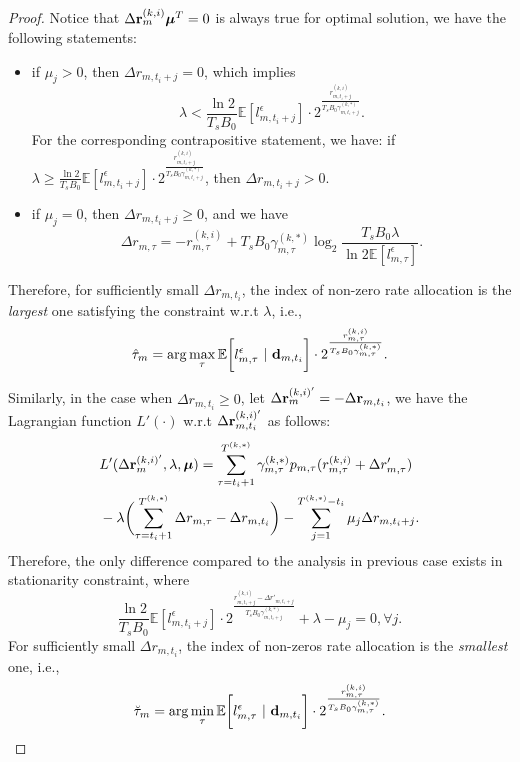 \begin{proof}
    Notice that $\Delta{{\mathbf{r}}}^{(k,i)}_{m} \boldsymbol{\mu}^T = 0$ is always true for optimal solution, we have the following statements:
    \begin{itemize}
        \item if $\mu_j > 0$, then $\Delta{r}_{m,t_i+j} = 0$, which implies
        $$
        \lambda < \frac{\ln{2}}{T_s B_0} \mathbb{E}[l^{\epsilon}_{m,t_i+j}] \cdot 2^{\frac{r^{(k,i)}_{m,t_i+j}}{T_s B_0 \gamma^{(k,*)}_{m,t_i+j}}}.
        $$
        For the corresponding contrapositive statement, we have: if $\lambda \geq \frac{\ln{2}}{T_s B_0} \mathbb{E}[l^{\epsilon}_{m,t_i+j}] \cdot 2^{\frac{r^{(k,i)}_{m,t_i+j}}{T_s B_0 \gamma^{(k,*)}_{m,t_i+j}}}$, then $\Delta{r}_{m,t_i+j} > 0$.
        \item if $\mu_j = 0$, then $\Delta{r}_{m,t_i+j} \geq 0$, and we have
        $$
        \Delta{r}_{m,\tau} = - r^{(k,i)}_{m,\tau} + T_s B_0 \gamma^{(k,*)}_{m,\tau} \log_2{\frac{T_s B_0 \lambda}{\ln{2} \mathbb{E}[l^{\epsilon}_{m,\tau}]}}.
        $$
    \end{itemize}

    Therefore, for sufficiently small $\Delta{r}_{m,t_i}$, the index of non-zero rate allocation is the {\it largest} one satisfying the constraint w.r.t $\lambda$, i.e.,
    $$
    \hat{\tau}_{m} = \arg\max_{\tau} \mathbb{E}\bigg[ l_{m,\tau}^{\epsilon}~|~\mathbf{d}_{m,t_i} \bigg]
                            \cdot 2^{\frac{r^{(k,i)}_{m,\tau}}{T_s B_0 \gamma^{(k,*)}_{m,\tau}}}.
    $$

    Similarly, in the case when $\Delta{r}_{m,t_i} \ge 0$, let $\Delta{{\mathbf{r}}}^{(k,i)'}_{m} = - \Delta{{\mathbf{r}}}_{m,t_i}$, we have the Lagrangian function $L'(\cdot)$ w.r.t $\Delta{{\mathbf{r}}}^{(k,i)'}_{m,t_i}$ as follows:
    \begin{align*}
        &L'( \Delta{\slide{r}}^{(k,i)'}_{m}, \lambda, \vecG{\mu} ) =
        \sum_{\tau=t_i+1}^{T^{(k,*)}} \gamma^{(k,*)}_{m,\tau} p_{m,\tau}( r^{(k,i)}_{m,\tau} + \Delta{r}'_{m,\tau} )
        \nonumber\\
        &- \lambda \Paren{ \sum_{\tau=t_i+1}^{T^{(k,*)}} \Delta{r}_{m,\tau} - \Delta{r}_{m,t_i} }
        - \sum_{j=1}^{T^{(k,*)}-t_i} \mu_{j} \Delta{r}_{m,t_i+j}.
    \end{align*}
    Therefore, the only difference compared to the analysis in previous case exists in stationarity constraint, where
    $$
    \frac{\ln{2}}{T_s B_0} \mathbb{E}[l^{\epsilon}_{m,t_i+j}] \cdot 2^{\frac{r^{(k,i)}_{m,t_i+j} - \Delta{r}'_{m,t_i+j}}{T_s B_0 \gamma^{(k,*)}_{m,t_i+j}}} + \lambda - \mu_j = 0,
        \forall j.
    $$
    For sufficiently small $\Delta{r}_{m,t_i}$, the index of non-zeros rate allocation is the {\it smallest} one, i.e.,
    $$
    \breve{\tau}_{m} = \arg\min_{\tau} \mathbb{E}\bigg[ l_{m,\tau}^{\epsilon}~|~\mathbf{d}_{m,t_i} \bigg]
                            \cdot 2^{\frac{r^{(k,i)}_{m,\tau}}{T_s B_0 \gamma^{(k,*)}_{m,\tau}}}.
    $$
\end{proof}
